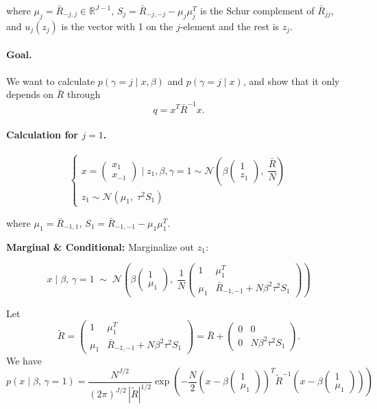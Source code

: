 \documentclass[11pt]{article}
\begin{document}
\noindent where $\mu_j = \bar{R}_{-j,j}\in \mathbb{R}^{J-1}$, \quad $S_j = \bar{R}_{-j,-j} - \mu_j\mu_j^T$ is the Schur complement of $\bar{R}_{jj}$, and $u_j(z_j)$ is the vector with 1 on the $j$-element and the rest is $z_j$.

\paragraph{Goal.} We want to calculate $p(\gamma = j \mid x,\beta)$ and $p(\gamma = j \mid x)$, and show that it only depends on $\bar{R}$ through
\[
q = x^T\bar{R}^{-1}x.
\]



\paragraph{Calculation for $j = 1$.}
\[
\begin{cases}
x = \begin{pmatrix} x_1 \\ x_{-1} \end{pmatrix} \mid z_1, \beta, \gamma=1
  \sim \mathcal{N} \left(\beta\begin{pmatrix}1\\z_1\end{pmatrix},\;
  \dfrac{\bar{R}}{N}\right) \\
z_1 \sim \mathcal{N}(\mu_1,\;\tau^2 S_1)
\end{cases}
\]

\noindent where $\mu_1 = \bar{R}_{-1,1}$, \quad $S_1 = \bar{R}_{-1,-1} - \mu_1\mu_1^T$.

\medskip
\noindent \textbf{Marginal \& Conditional:} Marginalize out $z_1$:

\[
x \mid \beta,\,\gamma=1 \;\sim\;
\mathcal{N}\!\left(
  \beta\begin{pmatrix}1\\\mu_1\end{pmatrix},\;
  \frac{1}{N}\begin{pmatrix}1 & \mu_1^T \\ \mu_1 & \bar{R}_{-1,-1}+N\beta^2\tau^2 S_1\end{pmatrix}
\right)
\]

\noindent Let
\[
\tilde{R}
= \begin{pmatrix} 1 & \mu_1^T \\ \mu_1 & \bar{R}_{-1,-1}+N\beta^2\tau^2 S_1 \end{pmatrix}
= \bar{R} + \begin{pmatrix} 0 & 0 \\ 0 & N\beta^2\tau^2 S_1 \end{pmatrix}.
\]
We have
\[
p(x \mid \beta,\,\gamma=1)
= \frac{N^{J/2}}{(2\pi)^{J/2}\,|\tilde{R}|^{1/2}}
  \exp\!\left(
    -\frac{N}{2}
    \left(x-\beta\begin{pmatrix}1\\\mu_1\end{pmatrix}\right)^{\!T}
    \tilde{R}^{-1}
    \left(x-\beta\begin{pmatrix}1\\\mu_1\end{pmatrix}\right)
  \right)
\]
\end{document}
